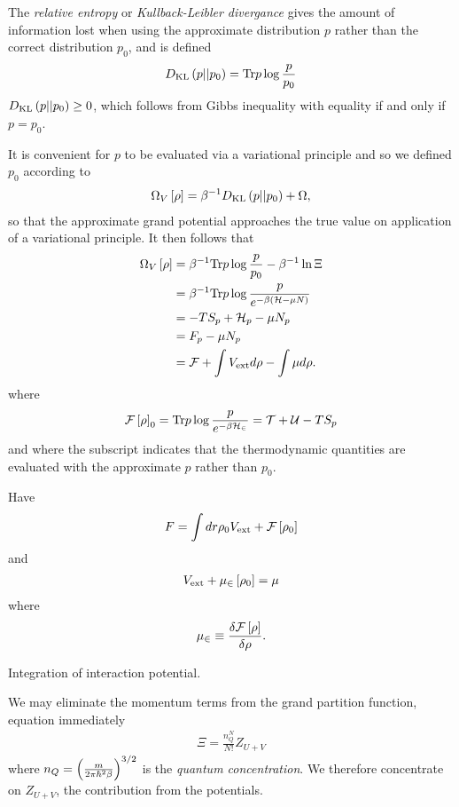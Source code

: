 {The {\em relative entropy } or {\em Kullback-Leibler divergance} gives the amount of information lost 
when using the approximate distribution  $p$ rather than the correct distribution $p_0$,
and is defined
\begin{align}
  D_{\text {KL}}\left( {p}||{p_0} \right) = \textrm{Tr} p \log \frac{p}{p_0} \label{eqn:nuc:KLD}
\end{align}
$D_{\text {KL}}\left( {p}||{p_0} \right) \ge 0$, which follows from Gibbs inequality with equality if and only if $p=p_0$.

It is convenient for $p$ to be evaluated via a variational principle and so we defined $p_0$ according to 
\begin{align}
 \Omega_V\left[ \rho \right] = \beta^{-1}D_{\text {KL}}\left( {p}||{p_0} \right)+   \Omega, 
\end{align}
so that the approximate grand potential approaches the true value on application of a variational principle.
It then follows that 
\begin{align}
  \Omega_V\left[ \rho \right] &= \beta^{-1} \textrm{Tr} p \log \frac{p}{p_0}  - \beta^{-1}\ln \Xi \\
  &= \beta^{-1} \textrm{Tr} p \log \frac{p}{e^{-\beta\left( {\cal H} - \mu N \right)}}\\
  &= - T S_p + {\cal H}_p - \mu N_p \\
  &= F_p - \mu N_p\\
  &= {\cal F} + \int V_{\text{ext}} d\rho - \int \mu d \rho.
\end{align}
where 
\begin{align}
 {\cal F}\left[ \rho \right]_0 = \textrm{Tr} p \log\frac{p}{e^{-\beta{\cal H}_\in}} = {\cal{T}} + {\cal{U}} - TS_p
\end{align}
and
where the subscript indicates that the thermodynamic quantities are evaluated with the approximate $p$ rather than $p_0$.




Have 
\begin{align}
F = \int dr \rho_0 V_{\text{ext}} + {\cal F}\left[ \rho_0 \right]
\end{align}
and 
\begin{align}
  V_{\text{ext}} + \mu_\in\left[ \rho_0 \right] = \mu
\end{align}
where
\begin{align}
  \mu_\in \equiv \frac{\delta {\cal F}\left[ \rho \right]}{\delta \rho}.
\end{align}


Integration of interaction potential.



We may eliminate the momentum terms from the grand partition function, equation  immediately
\begin{align}
  \Xi = \frac{n_Q^N}{N!} Z_{U+V} 
\end{align}
where $n_Q = \left( \frac{m}{2\pi\hbar^2 \beta} \right)^{3/2}$ is the {\em quantum concentration}.
We therefore concentrate on $Z_{U+V}$,
the contribution from the potentials.





}
